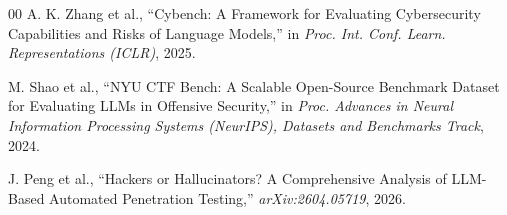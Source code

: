 \documentclass[conference]{IEEEtran}
\begin{document}
\begin{thebibliography}{00}
A. K. Zhang et al., ``Cybench: A Framework for Evaluating Cybersecurity Capabilities and Risks of Language Models,'' in \emph{Proc. Int. Conf. Learn. Representations (ICLR)}, 2025.

M. Shao et al., ``NYU CTF Bench: A Scalable Open-Source Benchmark Dataset for Evaluating LLMs in Offensive Security,'' in \emph{Proc. Advances in Neural Information Processing Systems (NeurIPS), Datasets and Benchmarks Track}, 2024.

J. Peng et al., ``Hackers or Hallucinators? A Comprehensive Analysis of LLM-Based Automated Penetration Testing,'' \emph{arXiv:2604.05719}, 2026.

\end{thebibliography}
\end{document}

